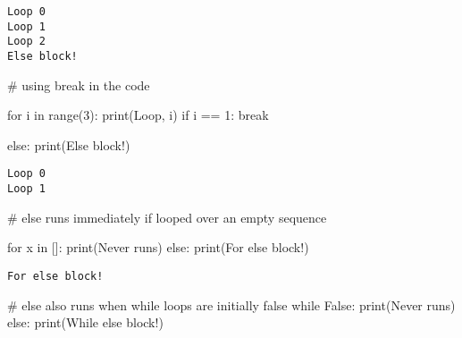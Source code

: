 \documentclass[
]{report}
\newenvironment{Shaded}{\begin{snugshade}}{\end{snugshade}}
\newcommand{\BuiltInTok}[1]{\textcolor[rgb]{0.00,0.23,0.31}{#1}}
\newcommand{\CommentTok}[1]{\textcolor[rgb]{0.37,0.37,0.37}{#1}}
\newcommand{\ControlFlowTok}[1]{\textcolor[rgb]{0.00,0.23,0.31}{#1}}
\newcommand{\DecValTok}[1]{\textcolor[rgb]{0.68,0.00,0.00}{#1}}
\newcommand{\KeywordTok}[1]{\textcolor[rgb]{0.00,0.23,0.31}{#1}}
\newcommand{\NormalTok}[1]{\textcolor[rgb]{0.00,0.23,0.31}{#1}}
\newcommand{\OperatorTok}[1]{\textcolor[rgb]{0.37,0.37,0.37}{#1}}
\newcommand{\StringTok}[1]{\textcolor[rgb]{0.13,0.47,0.30}{#1}}
\newcommand{\VariableTok}[1]{\textcolor[rgb]{0.07,0.07,0.07}{#1}}
\begin{document}
\begin{verbatim}
Loop 0
Loop 1
Loop 2
Else block!
\end{verbatim}

\begin{Shaded}
\begin{Highlighting}[]
\CommentTok{\# using break in the code}

\ControlFlowTok{for}\NormalTok{ i }\KeywordTok{in} \BuiltInTok{range}\NormalTok{(}\DecValTok{3}\NormalTok{):}
    \BuiltInTok{print}\NormalTok{(}\StringTok{\textquotesingle{}Loop\textquotesingle{}}\NormalTok{, i)}
    \ControlFlowTok{if}\NormalTok{ i }\OperatorTok{==} \DecValTok{1}\NormalTok{:}
        \ControlFlowTok{break}
        
\ControlFlowTok{else}\NormalTok{:}
    \BuiltInTok{print}\NormalTok{(}\StringTok{\textquotesingle{}Else block!\textquotesingle{}}\NormalTok{)}
\end{Highlighting}
\end{Shaded}

\begin{verbatim}
Loop 0
Loop 1
\end{verbatim}

\begin{Shaded}
\begin{Highlighting}[]
\CommentTok{\# else runs immediately if looped over an empty sequence}

\ControlFlowTok{for}\NormalTok{ x }\KeywordTok{in}\NormalTok{ []:}
    \BuiltInTok{print}\NormalTok{(}\StringTok{\textquotesingle{}Never runs\textquotesingle{}}\NormalTok{)}
\ControlFlowTok{else}\NormalTok{:}
    \BuiltInTok{print}\NormalTok{(}\StringTok{\textquotesingle{}For else block!\textquotesingle{}}\NormalTok{)}
\end{Highlighting}
\end{Shaded}

\begin{verbatim}
For else block!
\end{verbatim}

\begin{Shaded}
\begin{Highlighting}[]
\CommentTok{\# else also runs when while loops are initially false}
\ControlFlowTok{while} \VariableTok{False}\NormalTok{:}
    \BuiltInTok{print}\NormalTok{(}\StringTok{\textquotesingle{}Never runs\textquotesingle{}}\NormalTok{)}
\ControlFlowTok{else}\NormalTok{:}
    \BuiltInTok{print}\NormalTok{(}\StringTok{\textquotesingle{}While else block!\textquotesingle{}}\NormalTok{)}
\end{Highlighting}
\end{Shaded}
\end{document}
